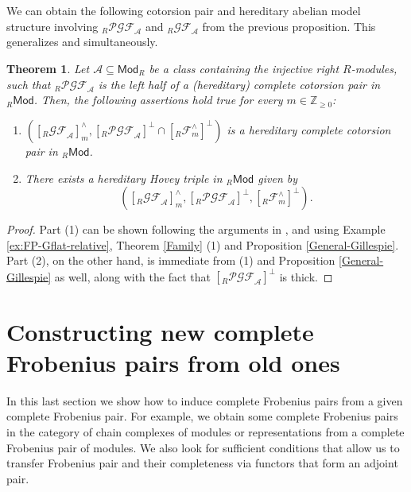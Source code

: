 \documentclass[10pt,reqno]{amsart}
\numberwithin{equation}{section}
\newtheorem{theorem}[definition]{Theorem}
\theoremstyle{remark}
\newcommand{\A}{\mathcal{A}}
\newcommand{\GF}{\mathcal{GF}}
\begin{document}
We can obtain the following cotorsion pair and hereditary abelian model structure involving ${}_R\mathcal{PGF}_{\mathcal{A}}$ and ${}_R\mathcal{GF}_{\mathcal{A}}$ from the previous proposition. This generalizes \cite[Coroll. 2.20 \& Thm. 3.2 (1)]{EstradaMarco} and \cite[Coroll. 3.5 \& Thm. 3.6]{Rachid} simultaneously. 


\begin{theorem} \label{GF_A-triple}
Let $\A \subseteq \mathsf{Mod}_R$ be a class containing the injective right $R$-modules, such that ${}_R\mathcal{PGF}_{\mathcal{A}}$ is the left half of a (hereditary) complete cotorsion pair in ${}_R\mathsf{Mod}$. Then, the following assertions hold true for every $m \in \mathbb{Z}_{\geq 0}$:
\begin{enumerate}[(1)]
\item $([{}_R\GF_{\A}]^\wedge_m, [{}_R\mathcal{PGF}_{\A}]^\perp \cap [{}_R\mathcal{F}^\wedge_m] ^\perp)$ is a hereditary complete cotorsion pair in ${}_R\mathsf{Mod}$. 

\item There exists a hereditary Hovey triple in ${}_R\mathsf{Mod}$ given by 
\[
([{}_R\GF_{\A}]^\wedge_m, [{}_R\mathcal{PGF}_{\A}]^\perp, [{}_R\mathcal{F}^\wedge_m]^\perp).
\]
\end{enumerate}
\end{theorem}


\begin{proof}
Part (1) can be shown following the arguments in \cite[Coroll. 3.5]{Rachid}, and using Example \ref{ex:FP-Gflat-relative}, Theorem \ref{Family} (1) and Proposition \ref{General-Gillespie}. Part (2), on the other hand, is immediate from (1) and Proposition \ref{General-Gillespie} as well, along with the fact that $[{}_R\mathcal{PGF}_{\A}]^\perp$ is thick.
\end{proof}



\section{Constructing new complete Frobenius pairs from old ones} \label{sec:applications}

In this last section we show how to induce complete Frobenius pairs from a given complete Frobenius pair. For example, we obtain some complete Frobenius pairs in the category of chain complexes of modules or representations from a complete Frobenius pair of modules. We also look for sufficient conditions that allow us to transfer Frobenius pair and their completeness via functors that form an adjoint pair. 
\end{document}

